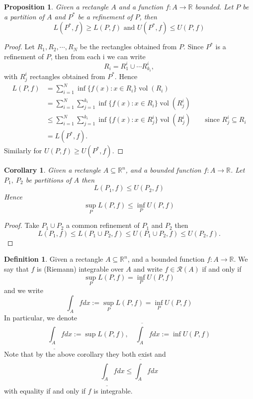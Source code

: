 \documentclass[11pt,openany]{book}
\theoremstyle{plain}
\newtheorem{corollary}{Corollary}[chapter]
\newtheorem{proposition}{Proposition}[chapter]
\theoremstyle{definition}
\newtheorem{definition}{Definition}[chapter]
\theoremstyle{remark}
\newcommand{\R}{\mathbb{R}}
\newcommand{\set}[1]{\{ #1 \}}
\newcommand{\vol}{\operatorname{vol}}
\begin{document}
\begin{proposition}
    Given a rectangle $A$ and a function $f \colon A \to \R$ bounded. Let $P$ be a partition of $A$ and $P^*$ be a refinement of $P$, then 
    $$L(P^*, f) \ge L(P, f) \text{ and } U(P^*, f) \le U(P, f)$$
\end{proposition}

\begin{proof}
    Let $R_1,R_2,\cdots,R_N$ be the rectangles obtained from $P$. Since $P^*$ is a refinement of $P$, then from each i we can write
    $$R_i=R_1^i\cup \cdots R_{k_i}^i,$$
    with $R_{j}^i$ rectangles obtained from $P^*$.
    Hence
    \begin{align*}
        L(P, f) &= \sum_{i=1}^N \inf \set{f(x) \colon x \in R_i} \vol (R_i) \\
        &= \sum_{i=1}^N \sum_{j=1}^{k_i} \inf \set{f(x) \colon x \in R_i} \vol (R_j^i) \\
        &\le \sum_{i=1}^N\sum_{j=1}^{k_i} \inf \set{f(x) \colon x \in R_j^i} \operatorname{vol} (R_j^i) \qquad \text{since $R_j^i\subseteq R_i$}\\
        &= L(P^*, f).
    \end{align*}
Similarly for $U(P, f) \ge U(P^*, f)$. 
\end{proof}

\begin{corollary}
    Given a rectangle $A \subseteq \R^n$, and a bounded function $f \colon A \to \R$. Let $P_1, \ P_2$ be partitions of $A$ then 
    $$L(P_1, f) \le U(P_2, f)$$
    Hence 
    $$\sup_P L(P, f) \le \inf_P U(P, f)$$
\end{corollary}

\begin{proof}
    Take $P_1\cup P_2$ a common refinement of $P_1$ and $P_2$ then
    $$L(P_1,f)\leq L(P_1\cup P_2,f)\leq U(P_1\cup P_2,f)\leq U(P_2,f).$$
\end{proof}

\begin{definition}
    Given a rectangle $A \subseteq \R^n$, and a bounded function $f \colon A \to \R$. We say that $f$ is (Riemann) integrable over $A$ and write $f\in \mathcal R(A)$ if and only if 
    $$\sup_P L(P, f) = \inf_P U(P, f)$$
    and we write 
    $$\int_{A} f dx := \sup_P L(P,f) = \inf_P U(P, f)$$
    In particular, we denote 
    $$\underline{\int_A} f dx := \sup L(P, f), \quad \overline{\int_{A}} f dx := \inf U(P,f)$$
    Note that by the above corollary they both exist and
    $$\underline{\int_A} f dx \le \overline{\int_A} f dx$$
    with equality if and only if $f$ is integrable.
\end{definition}
\end{document}
